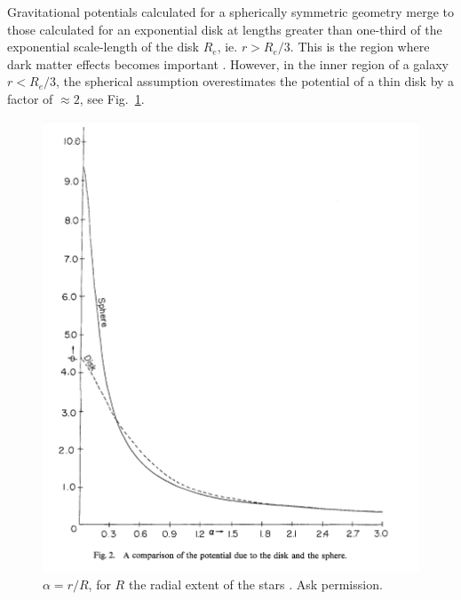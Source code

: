 \documentclass[reprint,%
 amsmath,amssymb,
 aps,
]{revtex4-1}
\begin{document}
Gravitational potentials calculated for  a spherically symmetric  geometry   
  merge to those calculated for an exponential disk  at lengths greater than one-third of the exponential scale-length of the disk $R_e$, ie.  $r> R_e/3$\cite{Chatterjee}. This is the region  where dark matter effects becomes important \cite{1985ApJAlbada}. 
However,  in the inner region of a galaxy $r< R_e/3$,  the spherical assumption   
    overestimates the potential of a thin disk by a factor of $\approx  2$, see Fig.~\ref{fig:my_geom}. 
 
  
  \begin{figure}
    \centering
    \includegraphics[width=\linewidth]{figures/Chatterjee_SphereDisk.png}
    \caption{ $\alpha = r/R$, for $R$ the radial extent of the stars \cite{Chatterjee}. Ask permission.}
    \label{fig:my_geom}
\end{figure}  
    
\end{document}
